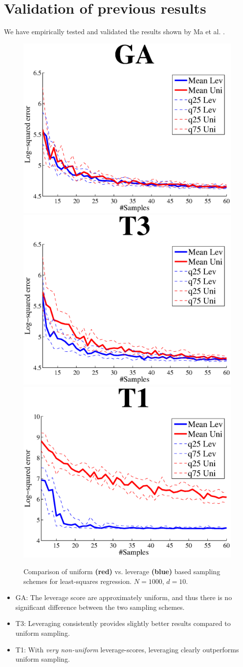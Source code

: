 \documentclass{article}
\begin{document}
\section{Validation of previous results}
We have empirically tested and validated the results shown by Ma et al. \cite{Ma}.
\begin{figure}[t]
\centering
\includegraphics[width=.49\linewidth]{images/GALS.eps}
\includegraphics[width=.49\linewidth]{images/T3LS.eps}
\includegraphics[width=.49\linewidth]{images/T1LS.eps}
\caption{Comparison of uniform {\bf\color{red}(red)} vs. leverage {\bf\color{blue}(blue)} based sampling schemes for least-squares regression. $N = 1000$, $d = 10$.}
\label{fig:regression_results}
\end{figure}

\begin{itemize}
\item GA: The leverage score are approximately uniform, and thus there is no significant difference between the two sampling schemes.
\item T3: Leveraging consistently provides slightly better results compared to uniform sampling.
\item T1: With \emph{very non-uniform} leverage-scores, leveraging clearly outperforms uniform sampling.
\end{itemize}
\end{document}
